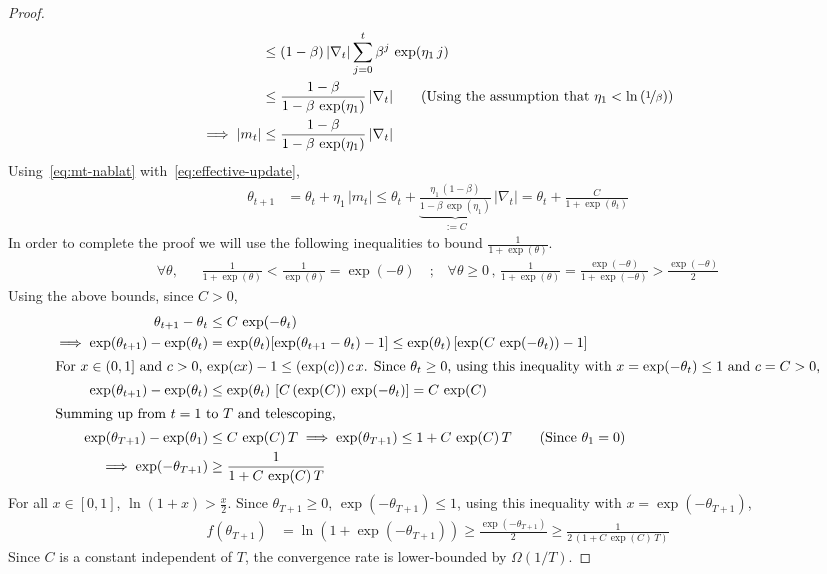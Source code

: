 \documentclass{article}
\newcommand{\tht}{\theta_t}
\newcommand{\thtt}{\theta_{t+1}}
\begin{document}
\begin{proof}
\begin{align}
& \leq (1-\beta) \, |\nabla_{t}|  \sum_{j = 0}^{t} \beta^j \, \exp(\eta_1 \, j) \nonumber \\
& \leq \frac{1-\beta}{1 - \beta \, \exp(\eta_1)} \, |\nabla_{t}|  \tag{Using the assumption that $\eta_1 < \ln\left(\nicefrac{1}{\beta}\right)$} \\
\implies |m_t| & \leq \frac{1-\beta}{1 - \beta \, \exp(\eta_1)} \, |\nabla_t| \label{eq:mt-nablat}
\end{align}
Using~\cref{eq:mt-nablat} with~\cref{eq:effective-update}, 
\begin{align*}
\thtt &= \tht + \eta_1 \, |m_t| \leq \tht + \underbrace{\frac{\eta_1 \,  (1-\beta)}{1 - \beta \, \exp(\eta_1)}}_{:= C} \, |\nabla_t|
= \tht + \frac{C}{1 + \exp(\tht)} \tag{Using the gradient expression}
\end{align*}
In order to complete the proof we will use the following inequalities to bound $\frac{1}{1 + \exp(\theta)}$. 
\begin{align}
\forall \theta \text{,} \quad & \frac{1}{1 + \exp(\theta)}  < \frac{1}{\exp(\theta)} = \exp(-\theta) \quad \text{;} \quad \forall \theta \geq 0 \,, \, \frac{1}{1 + \exp(\theta)} = \frac{\exp(-\theta)}{1 + \exp(-\theta)} > \frac{\exp(-\theta)}{2} \label{eq:grad-bounds}
\end{align}
Using the above bounds, since $C> 0$,
\begin{align}
\thtt - \tht & \leq C\, \exp(-\tht)  \nonumber \\
\implies \exp(\thtt) - \exp(\tht) &= \exp(\tht) [ \exp(\thtt - \tht) - 1] \leq \exp(\tht) \,  [ \exp(C\,  \exp(-\tht)) - 1]  \nonumber\\
\intertext{For $x \in (0, 1]$ and $c > 0$, $\exp(cx) - 1 \leq (\exp(c)) \, c \, x$. Since $\tht \geq 0$, using this inequality with $x = \exp(-\tht) \leq 1$ and $c = C > 0$,}
\exp(\thtt) - \exp(\tht) & \leq \exp(\tht) \, \left[ C\, (\exp(C))  \, \exp(-\tht) \right] = C \, \exp(C) \nonumber \\
\intertext{Summing up from $t = 1$ to $T$ and telescoping, }
\exp(\theta_{T+1}) - \exp(\theta_1) & \leq C \, \exp(C) \, T \implies \exp(\theta_{T+1}) \leq 1 + C \, \exp(C) \, T \tag{Since $\theta_1 = 0$} \\
\implies \exp(-\theta_{T+1}) & \geq \frac{1}{1 + C\, \exp(C) \, T} \label{eq:adagrd-inter}
\end{align}
For all $x \in [0,1]$, $\ln(1+x) > \frac{x}{2}$. Since $\theta_{T+1} \geq 0$, $\exp(-\theta_{T+1}) \leq 1$, using this inequality with $x = \exp(-\theta_{T+1})$,
\begin{align}
f(\theta_{T+1}) &= \ln(1 + \exp(-\theta_{T+1})) \geq \frac{\exp(-\theta_{T+1})}{2} \geq \frac{1}{2 \, (1 + C \, \exp(C) \, T)} 
\end{align}
Since $C$ is a constant independent of $T$, the convergence rate is lower-bounded by $\Omega(1/T)$. 
\end{proof}
\end{document}
